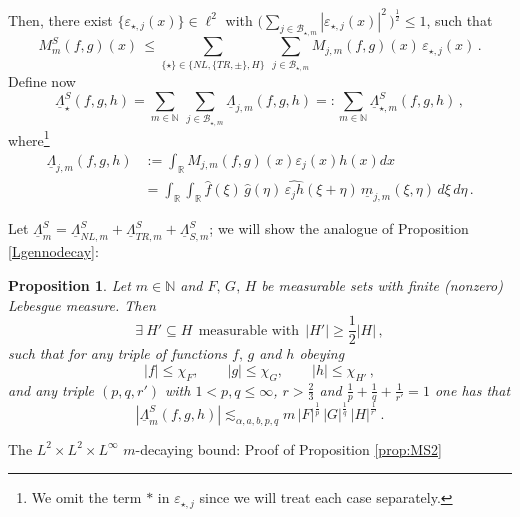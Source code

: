 \documentclass[a4paper,reqno]{amsart}
\makeatletter
\def\subsubsection{\@startsection{subsubsection}{3}%
	\z@{.5\linespacing\@plus.7\linespacing}{-.5em}%
	{\normalfont\bfseries\boldmath}}
\numberwithin{equation}{section}
\newtheorem{proposition}[theorem]{Proposition}
\theoremstyle{definition}
\newcommand{\R}{\mathbb{R}}
\newcommand{\N}{\mathbb{N}}
\newcommand{\e}{\varepsilon}
\newcommand{\um}{\underline{m}}
\newcommand{\uL}{\underline{\Lambda}}
\def\a{\alpha}
\def\B{\mathcal{B}}
\makeatother
\begin{document}
Then, there exist $\{\e_{\star,j}(x)\}\in\ell^2$ with $\big(\sum\limits_{j\in\B_{\star,m}} |\e_{\star,j}(x)|^2\,\big)^{\frac12}\le 1$, such that
\begin{equation*}
	M^S_m(f,g)(x)\,\le \sum_{\{\star\}\in\{NL,\{TR,\pm\},H\}}\: \sum_{j\in \B_{\star,m}} M_{j,m}(f,g)(x)\,\e_{\star,j}(x)\,.
\end{equation*}
Define now
\begin{equation}\label{uLstarS}
	\uL_\star^S(f,g,h)=\sum_{m\in\N}\:\sum_{j\in\B_{\star,m}}  \uL_{j,m}(f,g,h)=:\sum_{m\in\N}\uL_{\star,m}^S(f,g,h)\,,
\end{equation}
where\footnote{We omit the term ${*}$ in $\e_{\star,j}$ since we will treat each case separately.}
\begin{align}
	\uL_{j,m}(f,g,h)&:=\int_\R M_{j,m}(f,g)(x)\e_j(x)h(x)dx\nonumber\\
	&=\int_\R\int_\R \hat{f}(\xi)\,\hat{g}(\eta)\,\widehat{\e_j h}(\xi+\eta) \,\um_{j,m}(\xi,\eta)\,d\xi\,d\eta\,.\label{uLjm}
\end{align}

Let $\uL_m^S=\uL_{NL,m}^S+\uL_{TR,m}^S+\uL_{S,m}^S$; we will show the analogue of Proposition \ref{Lgennodecay}:

\begin{proposition}\label{prop:MSfull}
	Let $m\in\N$ and $F,\,G,\,H$ be measurable sets with finite (nonzero) Lebesgue measure. Then
	\begin{equation}\label{sets_hyp}
		\exists\:H'\subseteq H\:\:\textrm{measurable with}\:\:|H'|\geq \frac{1}{2} |H|\,,
	\end{equation}
	such that for any triple of functions $f,\,g$ and $h$ obeying
	\begin{equation}\label{func_hyp}
		|f|\leq \chi_{F},\qquad |g|\leq \chi_{G},\qquad |h|\leq \chi_{H'}\,,
	\end{equation}
	and any triple $(p,q,r')$ with $1<p,q\leq \infty$, $r>\frac{2}{3}$ and $\frac{1}{p}+\frac{1}{q}+\frac{1}{r'}=1$ one has that
	\begin{equation}\label{prop:MSfull-bound}
		|\uL^{S}_m(f,g,h)|\lesssim_{\a,a,b,p,q} m\,|F|^{\frac{1}{p}}\,|G|^{\frac{1}{q}}\,|H|^{\frac{1}{r'}}\,.
	\end{equation}
\end{proposition}

\subsubsection{The $L^2\times L^2\times L^\infty$ $m$-decaying bound: Proof of Proposition \ref{prop:MS2}}
\end{document}
